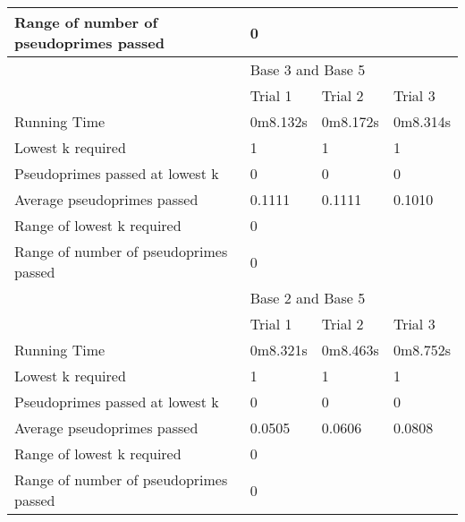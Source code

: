 \documentclass{article}
\begin{document}
\begin{appendices}
\begin{longtable}{llll}
Range of number of pseudoprimes passed & \multicolumn{3}{l}{0}                  \\
\midrule
                                       & \multicolumn{3}{l}{Base 3 and Base 5}  \\
\midrule
                                       & Trial 1  & Trial 2  & Trial 3          \\
Running Time                           & 0m8.132s & 0m8.172s & 0m8.314s         \\
Lowest k required                      & 1        & 1        & 1                \\
Pseudoprimes passed at lowest k        & 0        & 0        & 0                \\
Average pseudoprimes passed            & 0.1111   & 0.1111   & 0.1010           \\
\cmidrule(lr){2-4}
Range of lowest k required             & \multicolumn{3}{l}{0}                  \\
Range of number of pseudoprimes passed & \multicolumn{3}{l}{0}                  \\
\midrule
                                       & \multicolumn{3}{l}{Base 2 and Base 5}  \\
\midrule
                                       & Trial 1  & Trial 2  & Trial 3          \\
Running Time                           & 0m8.321s & 0m8.463s & 0m8.752s         \\
Lowest k required                      & 1        & 1        & 1                \\
Pseudoprimes passed at lowest k        & 0        & 0        & 0                \\
Average pseudoprimes passed            & 0.0505   & 0.0606   & 0.0808           \\
\cmidrule(lr){2-4}
Range of lowest k required             & \multicolumn{3}{l}{0}                  \\
Range of number of pseudoprimes passed & \multicolumn{3}{l}{0}                  \\
\bottomrule
\end{longtable}
\FloatBarrier


\end{appendices}
\end{document}
